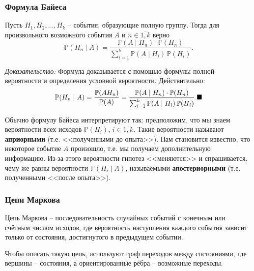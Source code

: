 \subsubsection{Формула Байеса}

\begin{theorem}
Пусть $H_1, H_2, \ldots, H_k$ -- события, образующие полную группу. Тогда для произвольного возможного события $A$ и $n \in \overline{1,k}$ верно
\[
\mathbb{P}(H_n \mid A) = \frac{\mathbb{P}(A \mid H_n) \cdot \mathbb{P}(H_n)}{\sum_{i=1}^{k} \mathbb{P}(A \mid H_i) \, \mathbb{P}(H_i)}.
\]
\end{theorem}

\textit{Доказательство:} Формула доказывается с помощью формулы полной вероятности и определения условной вероятности. Действительно:
\[
\mathbb{P}(H_n \mid A) = \frac{\mathbb{P}(AH_n)}{\mathbb{P}(A)} = \frac{\mathbb{P}(A \mid H_n) \cdot \mathbb{P}(H_n)}{\sum_{i=1}^{k} \mathbb{P}(A \mid H_i) \, \mathbb{P}(H_i)}. \hfill \blacksquare
\]


Обычно формулу Байеса интерпретируют так: предположим, что мы знаем вероятности всех исходов $\mathbb{P}(H_i)$, $i \in \overline{1,k}$. Такие вероятности называют \textbf{априорными} (т.е. <<полученными до опыта>>). Нам становится известно, что некоторое событие $A$ произошло, т.е. мы получаем дополнительную информацию. Из-за этого вероятности гипотез <<меняются>> и спрашивается, чему же равны вероятности $\mathbb{P}(H_i \mid A)$, называемыми \textbf{апостериорными} (т.е. полученными <<после опыта>>).


\subsubsection{Цепи Маркова}
\begin{definition}
Цепь Маркова -- последовательность случайных событий с конечным или счётным числом исходов, где вероятность наступления каждого события зависит только от состояния, достигнутого в предыдущем событии.
\end{definition}

Чтобы описать такую цепь, используют граф переходов между состояниями, где вершины -- состояния, а ориентированные рёбра -- возможные переходы.